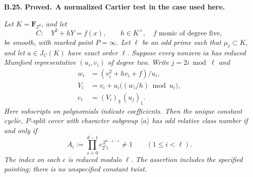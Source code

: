 \documentclass[11pt,a4paper]{article}
\newenvironment{claim}[3]{\par\medskip\noindent\hypertarget{#1}{\textbf{#1. #2.}}\ \textbf{#3.}\par\nopagebreak\smallskip\begingroup\itshape}{\endgroup\par\smallskip}
\begin{document}
\begin{claim}{B.25}{Proved}{A normalized Cartier test in the case used here}
Let $K=\mathbf F_{2^d}$, and let
\[
 C:\quad Y^2+hY=f(x),\qquad h\in K^\times,
 \quad f\text{ monic of degree five},
\]
be smooth, with marked point $P=\infty$. Let $\ell$ be an odd prime
such that $\mu_\ell\subset K$, and let $a\in J_C(K)$ have exact
order $\ell$. Suppose every nonzero $ia$ has reduced Mumford
representative $(u_i,v_i)$ of degree two. Write $j=2i\bmod\ell$ and
\[
 \begin{split}
 w_i&=(v_i^2+hv_i+f)/u_i,\\
 V_i&=v_i+u_i\bigl((w_i/h)\bmod u_i\bigr),\\
 c_i&=(V_i)_3\,(u_j)_1.
 \end{split}
\]
Here subscripts on polynomials indicate coefficients. Then the
unique constant cyclic, $P$-split cover with character subgroup
$\langle a\rangle$ has odd relative class number if and only if
\[
 A_i:=\prod_{s=0}^{d-1}c_{2^s i}^{\,2^{d-1-s}}\ne1
       \qquad(1\le i<\ell).
\]
The index on each $c$ is reduced modulo $\ell$. The assertion includes
the specified pointing; there is no unspecified constant twist.
\end{claim}
\end{document}
